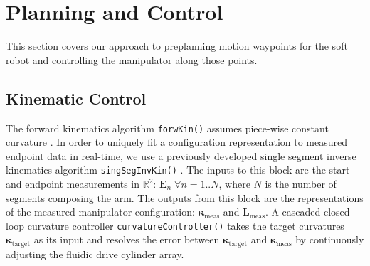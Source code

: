 \section{Planning and Control}
\label{sec:processing_and_control}
This section covers our approach to preplanning motion waypoints for the soft robot and controlling the manipulator along those points. 

\subsection{Kinematic Control}
The forward kinematics algorithm \texttt{forwKin()} assumes piece-wise constant curvature \cite{webster2010design}. 
In order to uniquely fit a configuration representation to measured endpoint data in real-time, we use a previously developed single segment inverse kinematics algorithm \texttt{singSegInvKin()} \cite{marchese2014design}.
The inputs to this block are the start and endpoint measurements in $\mathbb{R}^2$: $\mathbf{E}_n \; \forall n  = 1..N$, where $N$ is the number of segments composing the arm.
The outputs from this block are the representations of the measured manipulator configuration:  $\boldsymbol{\kappa}_{\textrm{meas}}$ and  $\mathbf{L}_{\textrm{meas}}$.
A cascaded closed-loop curvature controller \texttt{curvatureController()} takes the target curvatures $\boldsymbol{\kappa}_{\textrm{target}}$ as its input and resolves the error between $\boldsymbol{\kappa}_{\textrm{target}}$ and $\boldsymbol{\kappa}_{\textrm{meas}}$ by continuously adjusting the fluidic drive cylinder array.


